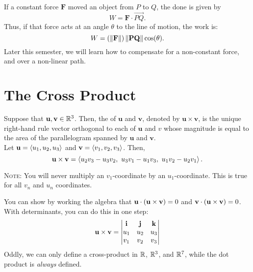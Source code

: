 If a constant force \(\mathbf{F}\) moved an object from \(P\) to \(Q\), the  done is given by
\[
    W = \mathbf{F} \cdot \overrightarrow{PQ}.
\]
Thus, if that force acts at an angle \(\theta\) to the line of motion, the work is:
\[
    W = (\left\lVert \mathbf{F}\right\rVert)\left\lVert \mathbf{PQ}\right\rVert\cos(\theta).
\]
Later this semester, we will learn how to compensate for a non-constant force, and over a non-linear path.


\newpage

\section{The Cross Product}

Suppose that \(\mathbf{u},\mathbf{v} \in \mathbb{R}^{3}\). Then, the  of \(\mathbf{u}\) and \(\mathbf{v}\), denoted by \(\mathbf{u} \times \mathbf{v}\), is the unique right-hand rule vector orthogonal to each of \(\mathbf{u}\) and \(v\) whose magnitude is equal to the area of the parallelogram spanned by \(\mathbf{u}\) and \(\mathbf{v}\). \\

Let \(\mathbf{u} = \left\langle u_{1},u_{2},u_{3} \right\rangle\) and \(\mathbf{v} = \left\langle v_{1},v_{2},v_{3} \right\rangle\). Then,
\[
    \mathbf{u} \times \mathbf{v} = \brackett{u_{2}v_{3} - u_{3}v_{2}, \ u_{3}v_{1} - u_{1}v_{3}, \ u_{1}v_{2} - u_{2}v_{1}}.
\]

\begin{center}
    \textsc{Note:} You will never multiply an \(v_{1}\)-coordinate by an \(u_{1}\)-coordinate. This is true for all \(v_{n}\) and \(u_{n}\) coordinates.
\end{center}

You can show by working the algebra that \(\mathbf{u} \cdot (\mathbf{u} \times \mathbf{v}) = 0 \) and \(\mathbf{v} \cdot (\mathbf{u} \times \mathbf{v}) = 0\). \\

With determinants, you can do this in one step:
\[
    \mathbf{u} \times \mathbf{v} = \begin{vmatrix}
        \mathbf{i} & \mathbf{j} & \mathbf{k} \\
        u_{1} & u_{2} & u_{3} \\
        v_{1} & v_{2} & v_{3}
    \end{vmatrix}
\]
Oddly, we can only define a cross-product in \(\mathbb{R}\), \(\mathbb{R}^{3}\), and \(\mathbb{R}^{7}\), while the dot product is \textit{always} defined.

